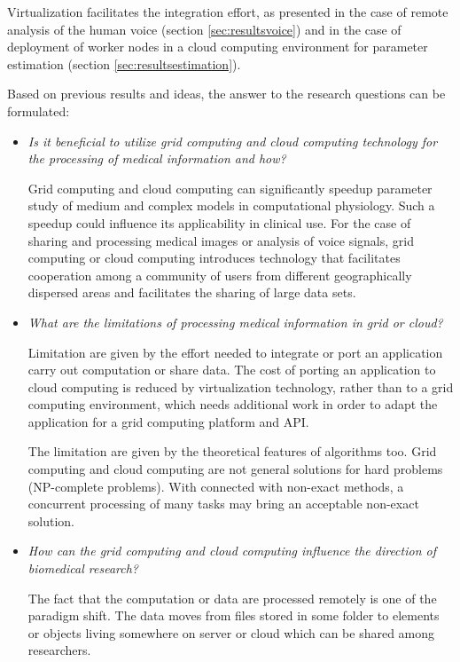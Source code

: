 Virtualization facilitates the integration effort, as presented in the case of remote analysis of the human voice (section \ref{sec:resultsvoice}) and in the case of deployment of worker nodes in a cloud computing environment for parameter estimation (section \ref{sec:resultsestimation}). 

Based on previous results and ideas, the answer to the research questions can be formulated:
\begin{itemize} 
\item \emph{Is it beneficial to utilize grid computing and cloud computing technology for the processing of medical information and how?}

Grid computing and cloud computing can significantly speedup parameter study of medium and complex models in computational physiology. Such a speedup could influence its applicability in clinical use. %
For the case of sharing and processing medical images or analysis of voice signals, grid computing or cloud computing introduces technology that facilitates cooperation among a community of users from different geographically dispersed areas and facilitates the sharing of large data sets.

\item \emph{What are the limitations of processing medical information in grid or cloud?}

Limitation are given by the effort needed to integrate or port an application carry out computation or share data. The cost of porting an application to cloud computing is reduced by virtualization technology, rather than to a grid computing environment, which needs additional work in order to adapt the application for a grid computing platform and API. 

The limitation are given by the theoretical features of algorithms too. Grid computing and cloud computing are not general solutions for hard problems (NP-complete problems). With connected with non-exact methods, a concurrent processing of many tasks may bring an acceptable non-exact solution.

\item \emph{How can the grid computing and cloud computing influence the direction of biomedical research?}

The fact that the computation or data are processed remotely is one of the paradigm shift. The data moves from files stored in some folder to elements or objects living somewhere on server or cloud which can be shared among researchers. 
 

\end{itemize}

